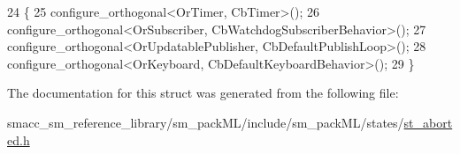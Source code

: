\begin{DoxyCode}
24     \{
25         configure\_orthogonal<OrTimer, CbTimer>();   
26         configure\_orthogonal<OrSubscriber, CbWatchdogSubscriberBehavior>();
27         configure\_orthogonal<OrUpdatablePublisher, CbDefaultPublishLoop>();
28         configure\_orthogonal<OrKeyboard, CbDefaultKeyboardBehavior>();
29     \}
\end{DoxyCode}


The documentation for this struct was generated from the following file\+:\begin{DoxyCompactItemize}
\item 
smacc\+\_\+sm\+\_\+reference\+\_\+library/sm\+\_\+pack\+M\+L/include/sm\+\_\+pack\+M\+L/states/\hyperlink{st__aborted_8h}{st\+\_\+aborted.\+h}\end{DoxyCompactItemize}
